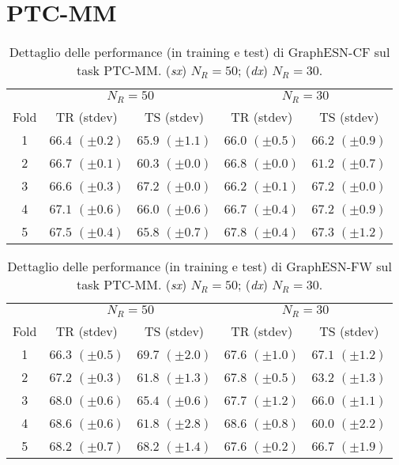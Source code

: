 \section{PTC-MM}


\begin{table}[tbph]
\footnotesize
\caption[Dettaglio performance: GraphESN-CF su PTC-MM]{Dettaglio delle performance (in training e test) di GraphESN-CF sul task PTC-MM. (\emph{sx}) $N_R=50$; (\emph{dx}) $N_R=30$.}
\label{app:esp:PTC-MM-CF}
\centering
\begin{tabular}{c*{4}{c}}
\toprule
& \multicolumn{2}{c}{$N_R=50$} & \multicolumn{2}{c}{$N_R=30$}\\
Fold & TR (stdev) & TS (stdev) & TR (stdev) & TS (stdev)\\
\midrule
1 & $66.4$ $(\pm 0.2)$ & $65.9$ $(\pm 1.1)$ & $66.0$ $(\pm 0.5)$ & $66.2$ $(\pm 0.9)$\\
2 & $66.7$ $(\pm 0.1)$ & $60.3$ $(\pm 0.0)$ & $66.8$ $(\pm 0.0)$ & $61.2$ $(\pm 0.7)$\\
3 & $66.6$ $(\pm 0.3)$ & $67.2$ $(\pm 0.0)$ & $66.2$ $(\pm 0.1)$ & $67.2$ $(\pm 0.0)$\\
4 & $67.1$ $(\pm 0.6)$ & $66.0$ $(\pm 0.6)$ & $66.7$ $(\pm 0.4)$ & $67.2$ $(\pm 0.9)$\\
5 & $67.5$ $(\pm 0.4)$ & $65.8$ $(\pm 0.7)$ & $67.8$ $(\pm 0.4)$ & $67.3$ $(\pm 1.2)$\\
\bottomrule
\end{tabular}
\end{table}




\begin{table}[tbph]
\footnotesize
\caption[Dettaglio performance: GraphESN-FW su PTC-MM]{Dettaglio delle performance (in training e test) di GraphESN-FW sul task PTC-MM. (\emph{sx}) $N_R=50$; (\emph{dx}) $N_R=30$.}
\label{app:esp:PTC-MM-FW}
\centering
\begin{tabular}{c*{4}{c}}
\toprule
& \multicolumn{2}{c}{$N_R=50$} & \multicolumn{2}{c}{$N_R=30$}\\
Fold & TR (stdev) & TS (stdev) & TR (stdev) & TS (stdev)\\
\midrule
1 & $66.3$ $(\pm 0.5)$ & $69.7$ $(\pm 2.0)$ & $67.6$ $(\pm 1.0)$ & $67.1$ $(\pm 1.2)$\\
2 & $67.2$ $(\pm 0.3)$ & $61.8$ $(\pm 1.3)$ & $67.8$ $(\pm 0.5)$ & $63.2$ $(\pm 1.3)$\\
3 & $68.0$ $(\pm 0.6)$ & $65.4$ $(\pm 0.6)$ & $67.7$ $(\pm 1.2)$ & $66.0$ $(\pm 1.1)$\\
4 & $68.6$ $(\pm 0.6)$ & $61.8$ $(\pm 2.8)$ & $68.6$ $(\pm 0.8)$ & $60.0$ $(\pm 2.2)$\\
5 & $68.2$ $(\pm 0.7)$ & $68.2$ $(\pm 1.4)$ & $67.6$ $(\pm 0.2)$ & $66.7$ $(\pm 1.9)$\\
\bottomrule
\end{tabular}
\end{table}


